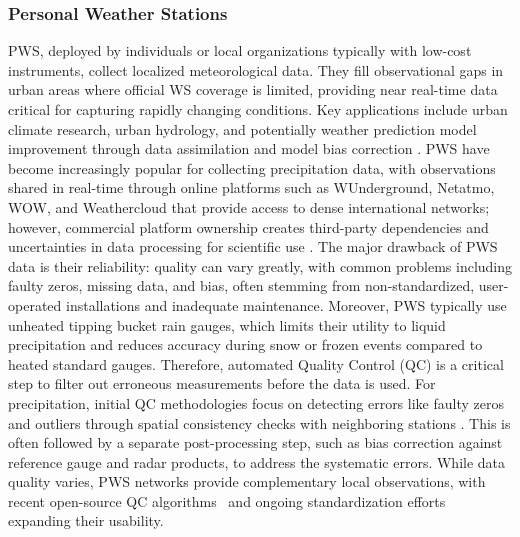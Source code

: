 \documentclass[manuscript]{copernicus}
\begin{document}
\subsubsection{Personal Weather Stations}
PWS, deployed by individuals or local organizations typically with low-cost instruments, collect localized meteorological data. They fill observational gaps in urban areas where official WS coverage is limited, providing near real-time data critical for capturing rapidly changing conditions. Key applications include urban climate research, urban hydrology, and potentially weather prediction model improvement through data assimilation and model bias correction \citep{bardossy2020use,brousse2022bias,de2017potential}.
PWS have become increasingly popular for collecting precipitation data, with observations shared in real-time through online platforms such as WUnderground, Netatmo, WOW, and Weathercloud that provide access to dense international networks; however, commercial platform ownership creates third-party dependencies and uncertainties in data processing for scientific use \citep{fencl2023data}. 
The major drawback of PWS data is their reliability: quality can vary greatly, with common problems including faulty zeros, missing data, and bias, often stemming from non-standardized, user-operated installations and inadequate maintenance. Moreover, PWS typically use unheated tipping bucket rain gauges, which limits their utility to liquid precipitation and reduces accuracy during snow or frozen events compared to heated standard gauges. 
Therefore, automated Quality Control (QC) is a critical step to filter out erroneous measurements before the data is used. For precipitation, initial QC  methodologies focus on detecting errors like faulty zeros and outliers through spatial consistency checks with neighboring stations \citep{de2019quality, el2024guide, el2023overview}. This is often followed by a separate post-processing step, such as bias correction against reference gauge and radar products, to address the systematic errors. 
While data quality varies, PWS networks provide complementary local observations, with recent open-source QC algorithms~\citep{cosmo2025apocs} and ongoing standardization efforts expanding their usability.
\end{document}
